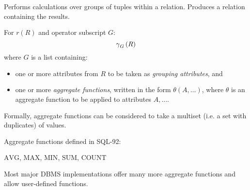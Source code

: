 \begin{multicols}{2}

    \begin{CheatsheetEntryFrame}

         \MarkExtendedRelAlg

        Performs calculations over groups of tuples within a relation. Produces a relation containing the results.

        For $r(R)$ and operator subscript $G$:
        \begin{equation*}
            \operatorname{\gamma}_G{(R)}
        \end{equation*}
        where $G$ is a list containing:
        \begin{itemize}
            \item one or more attributes from $R$ to be taken as \textit{grouping attributes}, and
            \item one or more \textit{aggregate functions}, written in the form $\theta{(A, \dots)}$, where $\theta$ is an aggregate function to be applied to attributes $A, \dots$.
        \end{itemize}


        Formally, aggregate functions can be considered to take a multiset (i.e. a set with duplicates) of values.

        Aggregate functions defined in SQL-92:
        \begin{center}
            $\text{AVG}$, $\text{MAX}$, $\text{MIN}$, $\text{SUM}$, $\text{COUNT}$
        \end{center}
        Most major DBMS implementations offer many more aggregate functions and allow user-defined functions.


\end{CheatsheetEntryFrame}
\end{multicols}
